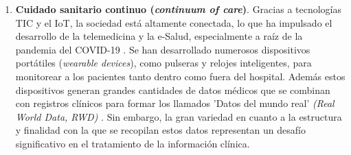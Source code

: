 
\begin{enumerate}

\item \textbf{Cuidado sanitario continuo (\textit{continuum of care})}. Gracias a tecnologías TIC y el IoT, la sociedad está altamente conectada, lo que ha impulsado el desarrollo de la telemedicina y la e-Salud, especialmente a raíz de la pandemia del COVID-19 \cite{martin2021ehealth}. Se han desarrollado numerosos dispositivos portátiles (\textit{wearable devices}), como pulseras y relojes inteligentes, para monitorear a los pacientes tanto dentro como fuera del hospital. Además estos dispositivos generan grandes cantidades de datos médicos que se combinan con registros clínicos para formar los llamados 'Datos del mundo real' \textit{(Real World Data, RWD)} \cite{kouroubali2019new}. Sin embargo, la gran variedad en cuanto a la estructura y finalidad con la que se recopilan estos datos representan un desafío significativo en el tratamiento de la información clínica.



\end{enumerate}
